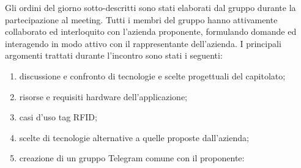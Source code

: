 Gli ordini del giorno sotto-descritti sono stati elaborati dal gruppo durante la partecipazione al meeting. Tutti i membri del gruppo hanno attivamente collaborato ed interloquito con l'azienda proponente, formulando domande ed interagendo in modo attivo con il rappresentante dell'azienda. I principali argomenti trattati durante l'incontro sono stati i seguenti:
\begin{enumerate}
    \item discussione e confronto di tecnologie e scelte progettuali del capitolato;
    \item risorse e requisiti hardware dell'applicazione;
    \item casi d'uso tag RFID;
    \item scelte di tecnologie alternative a quelle proposte dall'azienda;
    \item creazione di un gruppo Telegram comune con il proponente:
\end{enumerate}


